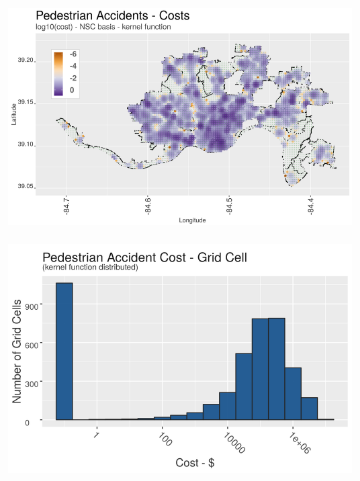 \documentclass{llncs}
\begin{document}
\FloatBarrier
\begin{figure}
 	\caption{Pedestrian Accidents - Comprehensive Cost Severity (\$ Millions)}
    \label{figure : PedestrianCosts}
  \begin{subfigure}[b]{0.5\textwidth}
    \includegraphics[width = \textwidth, height = \textheight, keepaspectratio]{trafficAccidentsPedestrianCosts.png}
    \label{figure : trafficAccidentsPedestrianCosts}
  \end{subfigure}
  \begin{subfigure}[b]{0.5\textwidth}
    \includegraphics[width = \textwidth, height = \textheight, keepaspectratio]{pedestrianAccidentCostsHistogram.png}
    \label{figure:pedestrianAccidentCostsHistogram}
  \end{subfigure}
\end{figure}
\FloatBarrier
\end{document}

